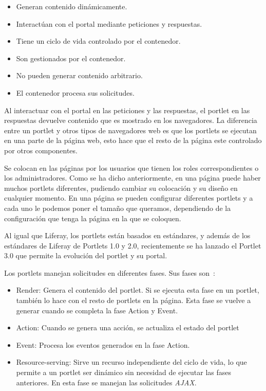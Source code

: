 \documentclass[a4paper, 12pt]{book}
\begin{document}
\begin{itemize}
\item Generan contenido dinámicamente.
\item Interactúan con el portal mediante peticiones y respuestas.
\item Tiene un ciclo de vida controlado por el contenedor.
\item Son gestionados por el contenedor.
\item No pueden generar contenido arbitrario.
\item El contenedor procesa sus solicitudes.
\end{itemize}

Al interactuar con el portal en las peticiones y las respuestas, el portlet en las respuestas devuelve contenido que es mostrado en los navegadores. La diferencia entre un portlet y otros tipos de navegadores web es que los portlets se ejecutan en una parte de la página web, esto hace que el resto de la página este controlado por otros componentes. 

Se colocan en las páginas por los usuarios que tienen los roles correspondientes o los administradores. Como se ha dicho anteriormente, en una página puede haber muchos portlets diferentes, pudiendo cambiar su colocación y su diseño en cualquier momento. En una página se pueden configurar diferentes portlets y a cada uno le podemos poner el tamaño que queramos, dependiendo de la configuración que tenga la página en la que se coloquen.

\vspace{5mm}
Al igual que Liferay, los portlets están basados en estándares, y además de los estándares de Liferay de Portlets 1.0 y 2.0, recientemente se ha lanzado el Portlet 3.0 que permite la evolución del portlet y su portal.

Los portlets manejan solicitudes en diferentes fases. Sus fases son~\cite{portlet_liferay}:
\begin{itemize}
\item Render: Genera el contenido del portlet. Si se ejecuta esta fase en un portlet, también lo hace con el resto de portlets en la página. Esta fase se vuelve a generar cuando se completa la fase Action y Event.
\item Action: Cuando se genera una acción, se actualiza el estado del portlet
\item Event: Procesa los eventos generados en la fase Action.
\item Resource-serving: Sirve un recurso independiente del ciclo de vida, lo que permite a un portlet ser dinámico sin necesidad de ejecutar las fases anteriores. En esta fase se manejan las solicitudes \textit{AJAX}.
\end{itemize}
\end{document}
